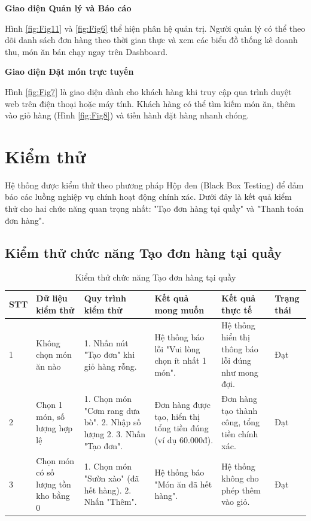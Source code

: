 
\textbf{Giao diện Quản lý và Báo cáo}

Hình \ref{fig:Fig11} và \ref{fig:Fig6} thể hiện phân hệ quản trị. Người quản lý có thể theo dõi danh sách đơn hàng theo thời gian thực và xem các biểu đồ thống kê doanh thu, món ăn bán chạy ngay trên Dashboard.

\textbf{Giao diện Đặt món trực tuyến}

Hình \ref{fig:Fig7} là giao diện dành cho khách hàng khi truy cập qua trình duyệt web trên điện thoại hoặc máy tính. Khách hàng có thể tìm kiếm món ăn, thêm vào giỏ hàng (Hình \ref{fig:Fig8}) và tiến hành đặt hàng nhanh chóng.

\section{Kiểm thử}

Hệ thống được kiểm thử theo phương pháp Hộp đen (Black Box Testing) để đảm bảo các luồng nghiệp vụ chính hoạt động chính xác. Dưới đây là kết quả kiểm thử cho hai chức năng quan trọng nhất: "Tạo đơn hàng tại quầy" và "Thanh toán đơn hàng".

\subsection{Kiểm thử chức năng Tạo đơn hàng tại quầy}

\begin{table}[H]
    \centering
    \caption{Kiểm thử chức năng Tạo đơn hàng tại quầy}
    \label{tab:test_create_order}
    \begin{tabular}{|p{0.5cm}|p{3.5cm}|p{4cm}|p{2.5cm}|p{2cm}|p{1.5cm}|}
        \hline
        \textbf{STT} & \textbf{Dữ liệu kiểm thử} & \textbf{Quy trình kiểm thử} & \textbf{Kết quả mong muốn} & \textbf{Kết quả thực tế} & \textbf{Trạng thái} \\
        \hline
        1 & Không chọn món ăn nào & 1. Nhấn nút "Tạo đơn" khi giỏ hàng rỗng. & Hệ thống báo lỗi "Vui lòng chọn ít nhất 1 món". & Hệ thống hiển thị thông báo lỗi đúng như mong đợi. & Đạt \\
        \hline
        2 & Chọn 1 món, số lượng hợp lệ & 1. Chọn món "Cơm rang dưa bò". 2. Nhập số lượng 2. 3. Nhấn "Tạo đơn". & Đơn hàng được tạo, hiển thị tổng tiền đúng (ví dụ 60.000đ). & Đơn hàng tạo thành công, tổng tiền chính xác. & Đạt \\
        \hline
        3 & Chọn món có số lượng tồn kho bằng 0 & 1. Chọn món "Sườn xào" (đã hết hàng). 2. Nhấn "Thêm". & Hệ thống báo "Món ăn đã hết hàng". & Hệ thống không cho phép thêm vào giỏ. & Đạt \\
        \hline
    \end{tabular}
\end{table}

